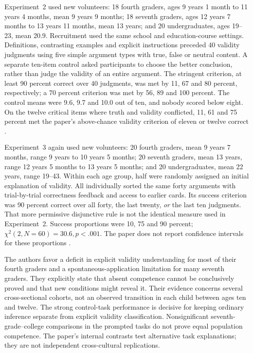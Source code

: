 Experiment~2 used new volunteers: 18 fourth graders, ages 9 years 1 month to
11 years 4 months, mean 9 years 9 months; 18 seventh graders, ages 12 years
7 months to 13 years 11 months, mean 13 years; and 20 undergraduates, ages
19--23, mean 20.9. Recruitment used the same school and education-course
settings. Definitions, contrasting examples and explicit instructions preceded
40 validity judgments using five simple argument types with true, false or
neutral content. A separate ten-item control asked participants to choose the
better conclusion, rather than judge the validity of an entire argument.
The stringent criterion, at least 90 percent correct over 40 judgments, was
met by 11, 67 and 80 percent, respectively; a 70 percent criterion was met by
56, 89 and 100 percent. The control means were 9.6, 9.7 and 10.0 out of ten,
and nobody scored below eight. On the twelve critical items where truth and
validity conflicted, 11, 61 and 75 percent met the paper's above-chance validity
criterion of eleven or twelve correct
\cite[pp.~158--161]{MoshmanFranks1986Validity}.

Experiment~3 again used new volunteers: 20 fourth graders, mean 9 years
7 months, range 9 years to 10 years 5 months; 20 seventh graders, mean
13 years, range 12 years 5 months to 13 years 5 months; and 20 undergraduates,
mean 22 years, range 19--43. Within each age group, half were randomly assigned
an initial explanation of validity. All individually sorted the same forty
arguments with trial-by-trial correctness feedback and access to earlier cards.
Its success criterion was 90 percent correct over all forty, the last twenty,
\emph{or} the last ten judgments. That more permissive disjunctive rule is not
the identical measure used in Experiment~2. Success proportions were 10, 75
and 90 percent; \(\chi^2(2,N=60)=30.6,p<.001\). The paper does not report
confidence intervals for these proportions
\cite[pp.~161--164]{MoshmanFranks1986Validity}.

The authors favor a deficit in explicit validity understanding for most of
their fourth graders and a spontaneous-application limitation for many seventh
graders. They explicitly state that absent competence cannot be conclusively
proved and that new conditions might reveal it. Their evidence concerns several
cross-sectional cohorts, not an observed transition in each child between ages
ten and twelve. The strong control-task performance is decisive for keeping
ordinary inference separate from explicit validity classification. Nonsignificant
seventh-grade--college comparisons in the prompted tasks do not prove equal
population competence. The paper's internal contrasts test alternative task
explanations; they are not independent cross-cultural replications.

